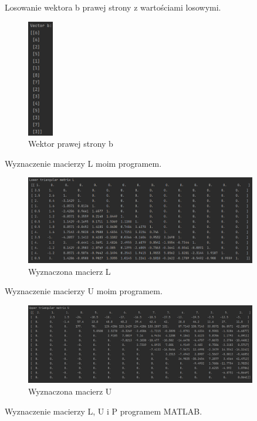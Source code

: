 \documentclass[9pt]{article}
\begin{document}
Losowanie wektora b prawej strony z wartościami losowymi.

\begin{figure}[h]
  \centering
  \includegraphics[width=0.1\textwidth]{vector_B_3.jpg}
  \caption{Wektor prawej strony b}
\end{figure}

Wyznaczenie macierzy L moim programem.

\begin{figure}[h]
  \centering
  \includegraphics[width=0.9\textwidth]{L_1.jpg}
  \caption{Wyznaczona macierz L}
\end{figure}

Wyznaczenie macierzy U moim programem.

\begin{figure}[h]
  \centering
  \includegraphics[width=0.9\textwidth]{U_1.jpg}
  \caption{Wyznaczona macierz U}
\end{figure}
\newpage

Wyznaczenie macierzy L, U i P programem MATLAB.
\end{document}
